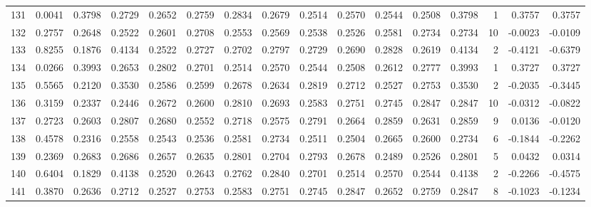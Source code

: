 \begin{tabular}{lrrrrrrrrrrrrrrr}
131 &      0.0041 &  0.3798 &  0.2729 &  0.2652 &  0.2759 &  0.2834 &  0.2679 &  0.2514 &  0.2570 &  0.2544 &   0.2508 &     0.3798 &      1 &                    0.3757 &                     0.3757 \\
132 &      0.2757 &  0.2648 &  0.2522 &  0.2601 &  0.2708 &  0.2553 &  0.2569 &  0.2538 &  0.2526 &  0.2581 &   0.2734 &     0.2734 &     10 &                   -0.0023 &                    -0.0109 \\
133 &      0.8255 &  0.1876 &  0.4134 &  0.2522 &  0.2727 &  0.2702 &  0.2797 &  0.2729 &  0.2690 &  0.2828 &   0.2619 &     0.4134 &      2 &                   -0.4121 &                    -0.6379 \\
134 &      0.0266 &  0.3993 &  0.2653 &  0.2802 &  0.2701 &  0.2514 &  0.2570 &  0.2544 &  0.2508 &  0.2612 &   0.2777 &     0.3993 &      1 &                    0.3727 &                     0.3727 \\
135 &      0.5565 &  0.2120 &  0.3530 &  0.2586 &  0.2599 &  0.2678 &  0.2634 &  0.2819 &  0.2712 &  0.2527 &   0.2753 &     0.3530 &      2 &                   -0.2035 &                    -0.3445 \\
136 &      0.3159 &  0.2337 &  0.2446 &  0.2672 &  0.2600 &  0.2810 &  0.2693 &  0.2583 &  0.2751 &  0.2745 &   0.2847 &     0.2847 &     10 &                   -0.0312 &                    -0.0822 \\
137 &      0.2723 &  0.2603 &  0.2807 &  0.2680 &  0.2552 &  0.2718 &  0.2575 &  0.2791 &  0.2664 &  0.2859 &   0.2631 &     0.2859 &      9 &                    0.0136 &                    -0.0120 \\
138 &      0.4578 &  0.2316 &  0.2558 &  0.2543 &  0.2536 &  0.2581 &  0.2734 &  0.2511 &  0.2504 &  0.2665 &   0.2600 &     0.2734 &      6 &                   -0.1844 &                    -0.2262 \\
139 &      0.2369 &  0.2683 &  0.2686 &  0.2657 &  0.2635 &  0.2801 &  0.2704 &  0.2793 &  0.2678 &  0.2489 &   0.2526 &     0.2801 &      5 &                    0.0432 &                     0.0314 \\
140 &      0.6404 &  0.1829 &  0.4138 &  0.2520 &  0.2643 &  0.2762 &  0.2840 &  0.2701 &  0.2514 &  0.2570 &   0.2544 &     0.4138 &      2 &                   -0.2266 &                    -0.4575 \\
141 &      0.3870 &  0.2636 &  0.2712 &  0.2527 &  0.2753 &  0.2583 &  0.2751 &  0.2745 &  0.2847 &  0.2652 &   0.2759 &     0.2847 &      8 &                   -0.1023 &                    -0.1234 \\

\end{tabular}
